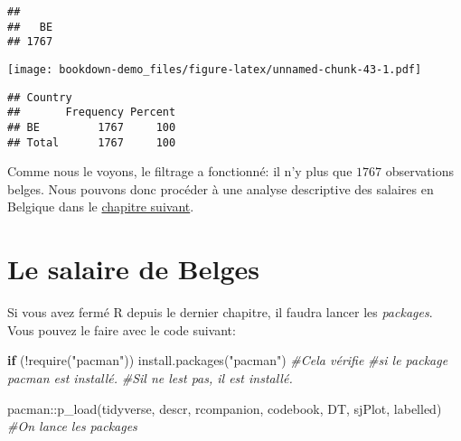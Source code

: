 \documentclass[
]{book}
\newenvironment{Shaded}{\begin{snugshade}}{\end{snugshade}}
\newcommand{\CommentTok}[1]{\textcolor[rgb]{0.56,0.35,0.01}{\textit{#1}}}
\newcommand{\ControlFlowTok}[1]{\textcolor[rgb]{0.13,0.29,0.53}{\textbf{#1}}}
\newcommand{\FunctionTok}[1]{\textcolor[rgb]{0.00,0.00,0.00}{#1}}
\newcommand{\NormalTok}[1]{#1}
\newcommand{\SpecialCharTok}[1]{\textcolor[rgb]{0.00,0.00,0.00}{#1}}
\newcommand{\StringTok}[1]{\textcolor[rgb]{0.31,0.60,0.02}{#1}}
\begin{document}
\begin{verbatim}
## 
##   BE 
## 1767
\end{verbatim}

\begin{Shaded}
\end{Shaded}

\texttt{[image: bookdown-demo\_files/figure-latex/unnamed-chunk-43-1.pdf]}

\begin{verbatim}
## Country 
##       Frequency Percent
## BE         1767     100
## Total      1767     100
\end{verbatim}

Comme nous le voyons, le filtrage a fonctionné: il n'y plus que \(1767\) observations belges. Nous pouvons donc procéder à une analyse descriptive des salaires en Belgique dans le \protect\hyperlink{salaire_belge_stat_desc}{chapitre suivant}.

\hypertarget{salaire_belge_stat_desc}{%
\chapter{Le salaire de Belges}\label{salaire_belge_stat_desc}}

Si vous avez fermé R depuis le dernier chapitre, il faudra lancer les \emph{packages}. Vous pouvez le faire avec le code suivant:

\begin{Shaded}
\begin{Highlighting}[]
\ControlFlowTok{if}\NormalTok{ (}\SpecialCharTok{!}\FunctionTok{require}\NormalTok{(}\StringTok{"pacman"}\NormalTok{)) }\FunctionTok{install.packages}\NormalTok{(}\StringTok{"pacman"}\NormalTok{) }\CommentTok{\#Cela vérifie}
                             \CommentTok{\#si le package pacman est installé.}
                             \CommentTok{\#S\textquotesingle{}il ne l\textquotesingle{}est pas, il est installé.}

\NormalTok{pacman}\SpecialCharTok{::}\FunctionTok{p\_load}\NormalTok{(tidyverse, descr, rcompanion, codebook,}
\NormalTok{               DT, sjPlot, labelled) }\CommentTok{\#On lance les packages}
\end{Highlighting}
\end{Shaded}
\end{document}
